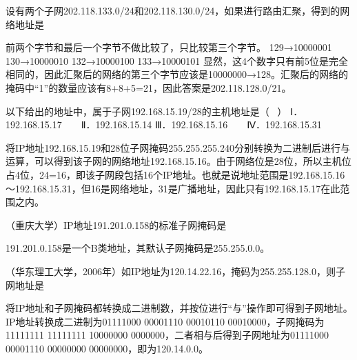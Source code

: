\question 设有两个子网202.118.133.0/24和202.118.130.0/24，如果进行路由汇聚，得到的网络地址是
\par{}
\begin{solution}前两个字节和最后一个字节不做比较了，只比较第三个字节。 129→10000001
130→10000010 132→10000100 133→10000101
显然，这4个数字只有前5位是完全相同的，因此汇聚后的网络的第三个字节应该是10000000→128。汇聚后的网络的掩码中``1''的数量应该有8+8+5=21，因此答案是202.118.128.0/21。
\end{solution}
\question 以下给出的地址中，属于子网192.168.15.19/28的主机地址是（ ~）
Ⅰ．192.168.15.17 ~ ~ Ⅱ．192.168.15.14 Ⅲ．192.168.15.16 ~ ~
Ⅳ．192.168.15.31
\par{}
\begin{solution}将IP地址192.168.15.19和28位子网掩码255.255.255.240分别转换为二进制后进行与运算，可以得到该子网的网络地址192.168.15.16。由于网络位是28位，所以主机位占4位，24=16，即该子网段包括16个IP地址。也就是说地址范围是192.168.15.16～192.168.15.31，但16是网络地址，31是广播地址，因此只有192.168.15.17在此范围之内。
\end{solution}
\question （重庆大学）IP地址191.201.0.158的标准子网掩码是
\par{}
\begin{solution}191.201.0.158是一个B类地址，其默认子网掩码是255.255.0.0。
\end{solution}
\question （华东理工大学，2006年）如IP地址为120.14.22.16，掩码为255.255.128.0，则子网地址是
\par{}
\begin{solution}将IP地址和子网掩码都转换成二进制数，并按位进行``与''操作即可得到子网地址。IP地址转换成二进制为01111000
00001110 00010110 00010000，子网掩码为11111111 11111111 10000000
0000000，二者相与后得到子网地址为01111000 00001110 00000000
00000000，即为120.14.0.0。
\end{solution}
